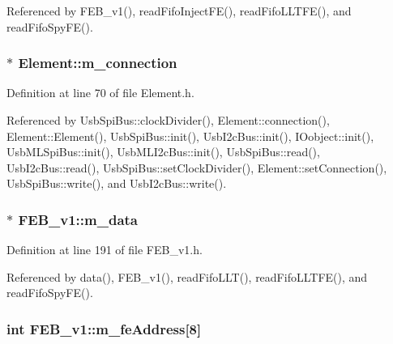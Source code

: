 Referenced by FEB\_\-v1(), readFifoInjectFE(), readFifoLLTFE(), and readFifoSpyFE().\hypertarget{classElement_abe3de7a5dbbc9a6dd2d7e012e5fdb266}{
\subsubsection[{m\_\-connection}]{$\ast$ {\bf Element::m\_\-connection}}}
\label{classElement_abe3de7a5dbbc9a6dd2d7e012e5fdb266}


Definition at line 70 of file Element.h.

Referenced by UsbSpiBus::clockDivider(), Element::connection(), Element::Element(), UsbSpiBus::init(), UsbI2cBus::init(), IOobject::init(), UsbMLSpiBus::init(), UsbMLI2cBus::init(), UsbSpiBus::read(), UsbI2cBus::read(), UsbSpiBus::setClockDivider(), Element::setConnection(), UsbSpiBus::write(), and UsbI2cBus::write().\hypertarget{classFEB__v1_a1c9dbc3660021dba1f58666d0097abb0}{
\subsubsection[{m\_\-data}]{$\ast$ {\bf FEB\_\-v1::m\_\-data}}}
\label{classFEB__v1_a1c9dbc3660021dba1f58666d0097abb0}


Definition at line 191 of file FEB\_\-v1.h.

Referenced by data(), FEB\_\-v1(), readFifoLLT(), readFifoLLTFE(), and readFifoSpyFE().\hypertarget{classFEB__v1_a4e1945c2d5b434125f375e9d0fc6d99f}{
\subsubsection[{m\_\-feAddress}]{\setlength{\rightskip}{0pt plus 5cm}int {\bf FEB\_\-v1::m\_\-feAddress}\mbox{[}8\mbox{]}}}
\label{classFEB__v1_a4e1945c2d5b434125f375e9d0fc6d99f}


